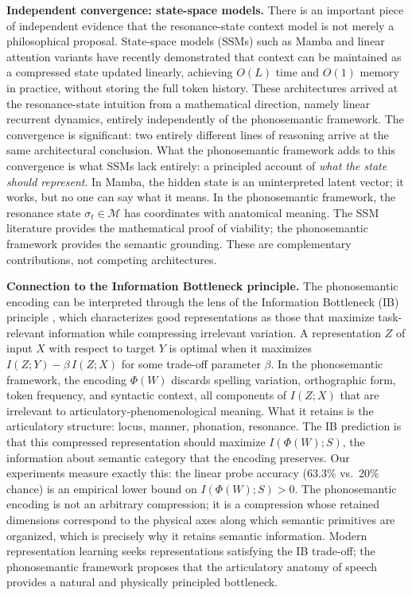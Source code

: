 \documentclass[12pt]{article}
\begin{document}
\textbf{Independent convergence: state-space models.} There is an important piece of independent evidence that the resonance-state context model is not merely a philosophical proposal. State-space models (SSMs) such as Mamba \cite{gu2022mamba} and linear attention variants \cite{katharopoulos2020} have recently demonstrated that context can be maintained as a compressed state updated linearly, achieving $O(L)$ time and $O(1)$ memory in practice, without storing the full token history. These architectures arrived at the resonance-state intuition from a mathematical direction, namely linear recurrent dynamics, entirely independently of the phonosemantic framework. The convergence is significant: two entirely different lines of reasoning arrive at the same architectural conclusion. What the phonosemantic framework adds to this convergence is what SSMs lack entirely: a principled account of \textit{what the state should represent}. In Mamba, the hidden state is an uninterpreted latent vector; it works, but no one can say what it means. In the phonosemantic framework, the resonance state $\sigma_t \in \mathcal{M}$ has coordinates with anatomical meaning. The SSM literature provides the mathematical proof of viability; the phonosemantic framework provides the semantic grounding. These are complementary contributions, not competing architectures.

\textbf{Connection to the Information Bottleneck principle.} The phonosemantic encoding can be interpreted through the lens of the Information Bottleneck (IB) principle \cite{tishby2000}, which characterizes good representations as those that maximize task-relevant information while compressing irrelevant variation. A representation $Z$ of input $X$ with respect to target $Y$ is optimal when it maximizes $I(Z;Y) - \beta\, I(Z;X)$ for some trade-off parameter $\beta$. In the phonosemantic framework, the encoding $\Phi(W)$ discards spelling variation, orthographic form, token frequency, and syntactic context, all components of $I(Z;X)$ that are irrelevant to articulatory-phenomenological meaning. What it retains is the articulatory structure: locus, manner, phonation, resonance. The IB prediction is that this compressed representation should maximize $I(\Phi(W); S)$, the information about semantic category that the encoding preserves. Our experiments measure exactly this: the linear probe accuracy (63.3\% vs.~20\% chance) is an empirical lower bound on $I(\Phi(W); S) > 0$. The phonosemantic encoding is not an arbitrary compression; it is a compression whose retained dimensions correspond to the physical axes along which semantic primitives are organized, which is precisely why it retains semantic information. Modern representation learning seeks representations satisfying the IB trade-off; the phonosemantic framework proposes that the articulatory anatomy of speech provides a natural and physically principled bottleneck.
\end{document}
